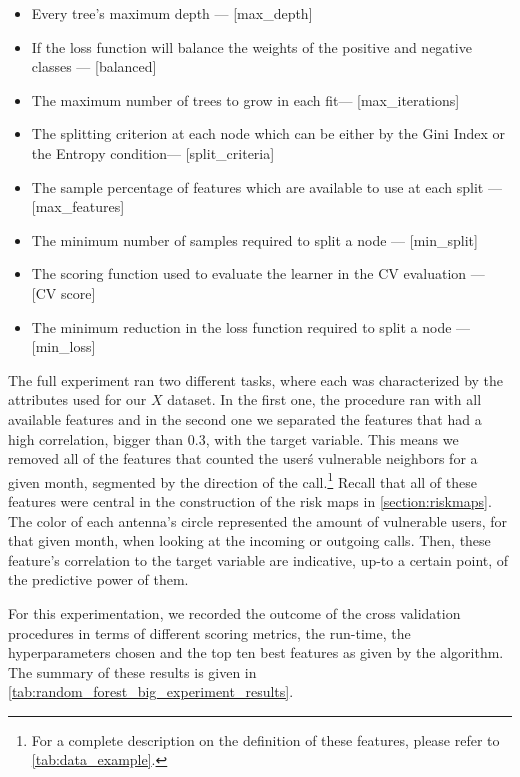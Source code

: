\begin{itemize}\label{list:random_forest_grid_search_params}

  \item Every tree's maximum depth --- [max\_depth]
  \item If the loss function will balance the weights of the positive and negative classes --- [balanced]
  \item The maximum number of trees to grow in each fit--- [max\_iterations]
  \item The splitting criterion at each node which can be either by the Gini Index or the Entropy condition--- [split\_criteria]
  \item The sample percentage of features which are available to use at each split --- [max\_features]
  \item The minimum number of samples required to split a node --- [min\_split]
  \item The scoring function used to evaluate the learner in the CV evaluation --- [CV score]
  \item The minimum reduction in the loss function required to split a node  --- [min\_loss]
\end{itemize}


The full experiment ran two different tasks, where each was characterized by the attributes used for our $X$ dataset.
In the first one, the procedure ran with all available features and in the second one we separated the features that had a high correlation, bigger than $0.3$, with the target variable.
This means we removed all of the features that counted the user\'s vulnerable neighbors for a given month, segmented by the direction of the call.\footnote{For a complete description on the definition of these features, please refer to \cref{tab:data_example}.}
Recall that all of these features were central in the construction of the risk maps in \cref{section:riskmaps}.
The color of each antenna's circle represented the amount of vulnerable users, for that given month, when looking at the incoming or outgoing calls.
Then, these feature's correlation to the target variable are indicative, up-to a certain point, of the predictive power of them.

For this experimentation, we recorded the outcome of the cross validation procedures in terms of different scoring metrics, the run-time, the hyperparameters chosen and the top ten best features as given by the algorithm. The summary of these results is given in \cref{tab:random_forest_big_experiment_results}.

